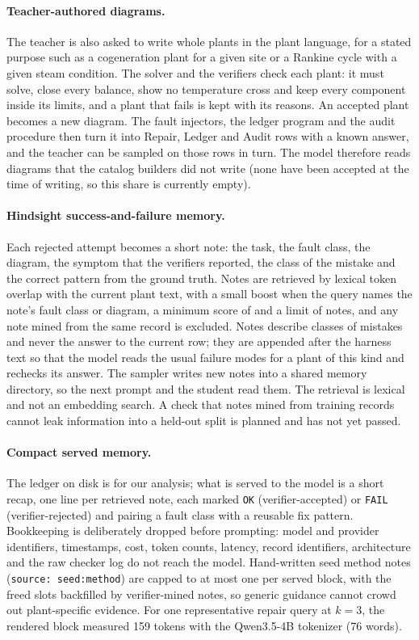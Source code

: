 \paragraph{Teacher-authored diagrams.}
The teacher is also asked to write whole plants in the plant language, for a stated purpose such as a cogeneration plant for a given site or a Rankine cycle with a given steam condition. The solver and the verifiers check each plant: it must solve, close every balance, show no temperature cross
and keep every component inside its limits, and a plant that fails is kept with its reasons. An accepted plant becomes a new diagram. The fault injectors, the ledger program and the audit procedure then turn it into Repair, Ledger and Audit rows with a known answer, and the teacher can be sampled on those rows in turn. The model therefore reads diagrams that the catalog builders did not write
(none have been accepted at the time of writing, so this share is currently empty).

\paragraph{Hindsight success-and-failure memory.}
Each rejected attempt becomes a short note: the task, the fault class, the diagram, the symptom that the verifiers reported, the class of the mistake and the correct pattern from the ground truth. Notes are retrieved by lexical token overlap with the current plant text,
with a small boost when the query names the note's fault class or diagram, a minimum score of  and a limit of  notes, and any note mined from the same record is excluded. Notes describe classes of mistakes and never the answer to the current row;
they are appended after the harness text so that the model reads the usual failure modes for a plant of this kind and rechecks its answer. The sampler writes new notes into a shared memory directory, so the next prompt and the student read them. The retrieval is lexical and not an embedding search. A check that notes mined from training records cannot leak information into a held-out split is planned and has not yet passed.

\paragraph{Compact served memory.}
The ledger on disk is for our analysis; what is served to the model is a short recap, one line per retrieved note, each marked \texttt{OK} (verifier-accepted) or \texttt{FAIL} (verifier-rejected) and pairing a fault class with a reusable fix pattern. Bookkeeping is deliberately dropped before prompting: model and provider identifiers, timestamps, cost, token counts, latency, record identifiers, architecture and the raw checker log do not reach the model. Hand-written seed method notes (\texttt{source: seed:method}) are capped to at most one per served block, with the freed slots backfilled by verifier-mined notes, so generic guidance cannot crowd out plant-specific evidence. For one representative repair query at $k=3$, the rendered block measured 159 tokens with the Qwen3.5-4B tokenizer (76 words).

